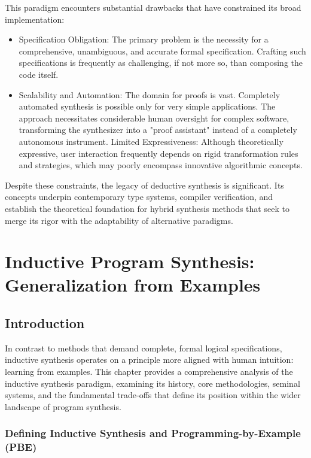 \documentclass[12pt, a4paper]{report}
\begin{document}
This paradigm encounters substantial drawbacks that have constrained its broad implementation:
 \begin{itemize} 
    \item \textbf{} {Specification Obligation:}  The primary problem is the necessity for a comprehensive, unambiguous, and accurate formal specification.  Crafting such specifications is frequently as challenging, if not more so, than composing the code itself.
     \item \textbf{} Scalability and Automation:  The domain for proofs is vast.  Completely automated synthesis is possible only for very simple applications.  The approach necessitates considerable human oversight for complex software, transforming the synthesizer into a "proof assistant" instead of a completely autonomous instrument.
     Limited Expressiveness:  Although theoretically expressive, user interaction frequently depends on rigid transformation rules and strategies, which may poorly encompass innovative algorithmic concepts.
\end{itemize}

Despite these constraints, the legacy of deductive synthesis is significant.  Its concepts underpin contemporary type systems, compiler verification, and establish the theoretical foundation for hybrid synthesis methods that seek to merge its rigor with the adaptability of alternative paradigms.


\chapter{Inductive Program Synthesis: Generalization from Examples}
\label{chap:inductive}

\section{Introduction}

In contrast to methods that demand complete, formal logical specifications, inductive synthesis operates on a principle more aligned with human intuition: learning from examples. This chapter provides a comprehensive analysis of the inductive synthesis paradigm, examining its history, core methodologies, seminal systems, and the fundamental trade-offs that define its position within the wider landscape of program synthesis.

\subsection{Defining Inductive Synthesis and Programming-by-Example (PBE)}
\end{document}
